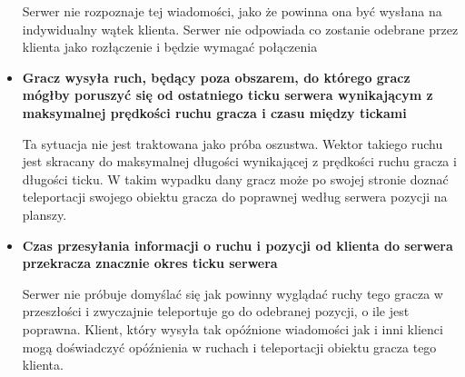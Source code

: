 \documentclass{article}
\begin{document}
\begin{itemize}
    Serwer nie rozpoznaje tej wiadomości, jako że powinna ona być wysłana na indywidualny wątek klienta. Serwer nie odpowiada co zostanie odebrane przez klienta jako rozłączenie i będzie wymagać połączenia
    
    \item \textbf{Gracz wysyła ruch, będący poza obszarem, do którego gracz mógłby poruszyć się od ostatniego ticku serwera
    wynikającym z maksymalnej prędkości ruchu gracza i czasu między tickami}

    Ta sytuacja nie jest traktowana jako próba oszustwa. Wektor takiego ruchu jest skracany do maksymalnej
długości wynikającej z prędkości ruchu gracza i długości ticku. W takim wypadku dany gracz może po swojej stronie doznać teleportacji swojego obiektu gracza do poprawnej według serwera pozycji na planszy.

  \item \textbf{Czas przesyłania informacji o ruchu i pozycji od klienta do serwera przekracza znacznie okres ticku serwera}
  
  Serwer nie próbuje domyślać się jak powinny wyglądać ruchy tego gracza w przeszłości i zwyczajnie teleportuje go do odebranej pozycji, o ile jest poprawna. Klient, który wysyła tak opóźnione wiadomości jak i inni klienci mogą doświadczyć opóźnienia w ruchach i teleportacji obiektu gracza tego klienta.
\end{itemize}
\end{document}
